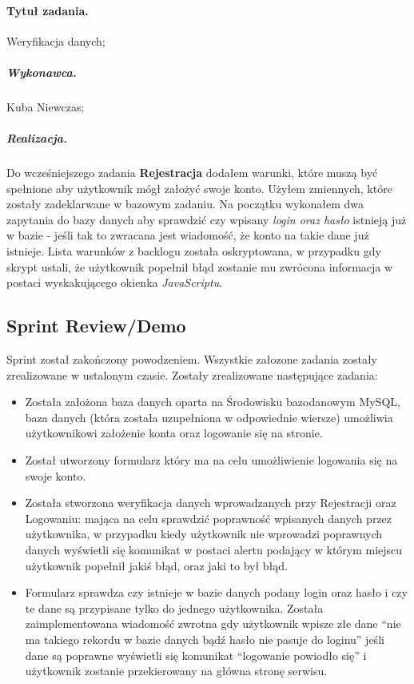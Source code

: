 \documentclass[a4paper]{article}
\begin{document}
	\paragraph{Tytuł zadania.} Weryfikacja danych;
	\subparagraph{Wykonawca.} Kuba Niewczas;
	\subparagraph{Realizacja.} Do wcześniejszego zadania \textbf{Rejestracja} dodałem warunki, które muszą być spełnione aby użytkownik mógł założyć swoje konto. Użyłem zmiennych, które zostały zadeklarwane w bazowym zadaniu. Na początku wykonałem dwa zapytania do bazy danych aby sprawdzić czy wpisany \emph{login oraz hasło} istnieją już w bazie - jeśli tak to zwracana jest wiadomość, że konto na takie dane już istnieje. Lista warunków z backlogu została oskryptowana, w przypadku gdy skrypt ustali, że użytkownik popełnił błąd zostanie mu zwrócona informacja w postaci wyskakującego okienka \emph{JavaScriptu}.
	
	\subsection{Sprint Review/Demo}
	Sprint został zakończony powodzeniem. Wszystkie załozone zadania zostały zrealizowane w ustalonym czasie. Zostały zrealizowane następujące zadania:
	
\begin{itemize}
\item Została założona baza danych oparta na Środowisku bazodanowym MySQL, baza danych (która została uzupełniona w odpowiednie wiersze) umożliwia użytkownikowi założenie konta oraz logowanie się na stronie.
\item Został utworzony formularz który ma na celu umożliwienie logowania się na swoje konto.

\item Została stworzona weryfikacja danych wprowadzanych przy Rejestracji oraz Logowaniu: mająca na celu sprawdzić poprawność wpisanych danych przez użytkownika, w przypadku kiedy użytkownik nie wprowadzi poprawnych danych wyświetli się komunikat w postaci alertu podający w którym miejscu użytkownik popełnił jakiś błąd, oraz jaki to był błąd.

\item Formularz sprawdza czy istnieje w bazie danych podany login oraz hasło i czy te dane są przypisane tylko do jednego użytkownika. Została zaimplementowana wiadomość zwrotna gdy użytkownik wpisze złe dane “nie ma takiego rekordu w bazie danych bądź hasło nie pasuje do loginu” jeśli dane są poprawne wyświetli się komunikat “logowanie powiodło się” i użytkownik zostanie przekierowany na główna stronę serwisu.

\end{itemize}
\end{document}
